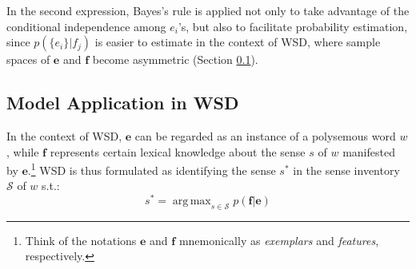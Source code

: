 \documentclass[11pt]{article}
\DeclareMathOperator*{\argmax}{arg\,max}
\begin{document}
 

\noindent In the second expression, Bayes's rule is applied not only
to take advantage of the conditional independence among $e_i$'s, but
also to facilitate probability estimation, since $p(\{e_i\}|f_j)$ is
easier to estimate in the context of WSD, where sample spaces of
$\mathbf{e}$ and $\mathbf{f}$ become asymmetric (Section
\ref{sec:model-appl-wsd}).

\subsection{Model Application in WSD}
\label{sec:model-appl-wsd}
In the context of WSD, $\mathbf{e}$ can be regarded as an instance of
a polysemous word $w$, while $\mathbf{f}$ represents certain lexical
knowledge about the sense $s$ of $w$ manifested by
$\mathbf{e}$.\footnote{Think of the notations $\mathbf{e}$ and
  $\mathbf{f}$ mnemonically as \textit{exemplars} and
  \textit{features}, respectively.}  WSD is thus formulated as
identifying the sense $s^*$ in the sense inventory $\mathcal{S}$ of
$w$ s.t.:
\begin{equation}
  \label{eq:wsd}
s^*=\argmax_{s\in\mathcal{S}}p(\mathbf{f}|\mathbf{e})
\end{equation}
\end{document}
